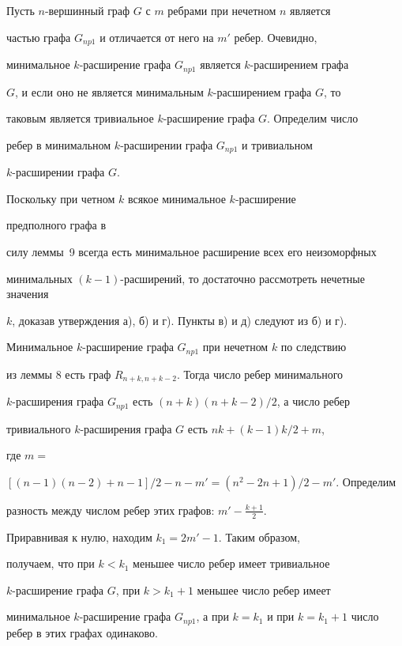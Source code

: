 \begin{pf}


Пусть $n$-вершинный граф $G$ с $m$ ребрами при нечетном $n$ является


частью графа $G_{np1}$ и отличается от него на $m'$ ребер. Очевидно, 


минимальное $k$-расширение графа $G_{np1}$ является $k$-расширением графа


$G$, и если оно не является минимальным $k$-расширением графа $G$, то 


таковым является тривиальное $k$-расширение графа $G$. Определим число


ребер в минимальном $k$-расширении графа $G_{np1}$ и тривиальном


$k$-расширении графа $G$.





Поскольку при четном $k$ всякое минимальное $k$-расширение


предполного графа в


силу леммы~9 всегда есть минимальное расширение всех его неизоморфных


минимальных $(k-1)$-расширений, то достаточно рассмотреть нечетные значения


$k$, доказав утверждения а), б) и г). Пункты в) и д) следуют из б) и г).





Минимальное $k$-расширение графа $G_{np1}$ при нечетном $k$ по следствию


из леммы 8 есть граф $R_{n+k,n+k-2}$. Тогда число ребер минимального


$k$-расширения графа $G_{np1}$ есть $(n + k)(n + k - 2)/2$, а число ребер


тривиального $k$-расширения графа $G$ есть $nk + (k - 1)k/2 + m$,


где $m =$\linebreak


$[(n-1)(n-2)+n-1]/2-n-m'=(n^2-2n+1)/2 - m'$. Определим


разность между числом ребер этих графов: $ m' - \frac{k+1}{2} $.


Приравнивая к нулю, находим $k_1 = 2m' - 1$. Таким образом,


получаем, что при $k < k_1$ меньшее число ребер имеет тривиальное


$k$-расширение графа $G$, при $k > k_1 + 1$ меньшее число ребер имеет


минимальное $k$-расширение графа $G_{np1}$, а при $k = k_1$ и при $k = k_1


+ 1$ число ребер в этих графах одинаково.


\end{pf}


